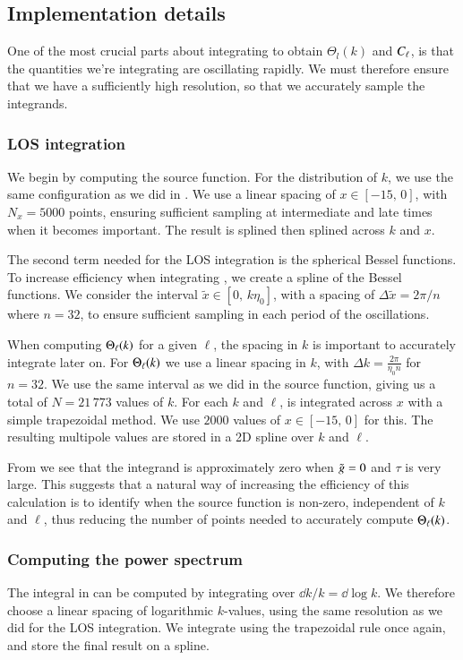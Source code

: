 \subsection{Implementation details}\label{ssec:M4:implementations} 
One of the most crucial parts about integrating to obtain $\Theta_l(k)$ and $C_\ell$, is that the quantities we're integrating are oscillating rapidly. We must therefore ensure that we have a sufficiently high resolution, so that we accurately sample the integrands. 

\subsubsection{LOS integration} \label{sssec:M4:implementations:LOS_integration}
We begin by computing the source function. For the distribution of $k$, we use the same configuration as we did in . We use a linear spacing of $x\in[-15,\,0]$, with $N_x=5000$ points, ensuring sufficient sampling at intermediate and late times when it becomes important. The result is splined then splined across $k$ and $x$.  

The second term needed for the LOS integration is the spherical Bessel functions. To increase efficiency when integrating , we create a spline of the Bessel functions. We consider the interval $\tilde{x}\in[0,\,k\eta_0]$, with a spacing of $\Delta\tilde{x}=2\pi/n$ where $n=32$, to ensure sufficient sampling in each period of the oscillations. 

When computing $\Theta_\ell(k)$ for a given $\ell$, the spacing in $k$ is important to accurately integrate  later on. For $\Theta_\ell(k)$ we use a linear spacing in $k$, with $\Delta k=\frac{2\pi}{\eta_0 n}$ for $n=32$. We use the same interval as we did in the source function, giving us a total of $N=21\,773$ values of $k$. For each $k$ and $\ell$,  is integrated across $x$ with a simple trapezoidal method. We use $2000$ values of $x\in[-15,\,0]$ for this. The resulting multipole values are stored in a 2D spline over $k$ and $\ell$.  

From  we see that the integrand is approximately zero when $\tilde{g}=0$ and $\tau$ is very large. This suggests that a natural way of increasing the efficiency of this calculation is to identify when the source function is non-zero, independent of $k$ and $\ell$, thus reducing the number of points needed to accurately compute $\Theta_\ell(k)$.

\subsubsection{Computing the power spectrum} \label{sssec:M4:implementations:integrating_across_k}
The integral in  can be computed by integrating over $\dd k/k=\dd \log k$. We therefore choose a linear spacing of logarithmic $k$-values, using the same resolution as we did for the LOS integration. We integrate using the trapezoidal rule once again, and store the final result on a spline.   